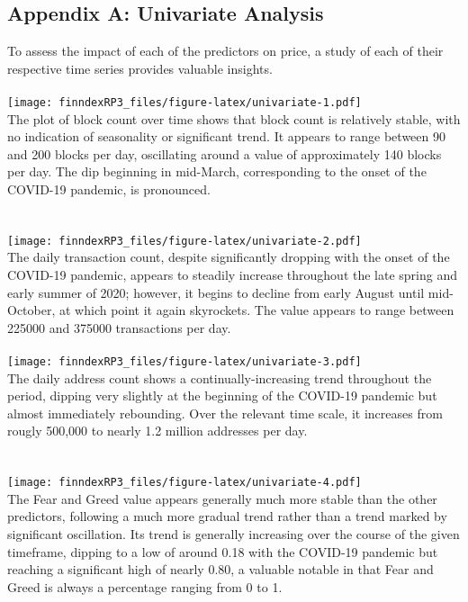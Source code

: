 \documentclass{article}
\begin{document}
\subsection{Appendix A: Univariate Analysis}
To assess the impact of each of the predictors on price, a study of each of their respective time series provides valuable insights. \\~\\
\texttt{[image: finndexRP3\_files/figure-latex/univariate-1.pdf]} \\
The plot of block count over time shows that block count is relatively stable, with no indication of seasonality or significant trend. It appears to range between 90 and 200 blocks per day, oscillating around a value of approximately 140 blocks per day. The dip beginning in mid-March, corresponding to the onset of the COVID-19 pandemic, is pronounced. \\~\\~\\
\texttt{[image: finndexRP3\_files/figure-latex/univariate-2.pdf]} \\
The daily transaction count, despite significantly dropping with the onset of the COVID-19 pandemic, appears to steadily increase throughout the late spring and early summer of 2020; however, it begins to decline from early August until mid-October, at which point it again skyrockets. The value appears to range between 225000 and 375000 transactions per day. \\~\\
\texttt{[image: finndexRP3\_files/figure-latex/univariate-3.pdf]} \\ 
The daily address count shows a continually-increasing trend throughout the period, dipping very slightly at the beginning of the COVID-19 pandemic but almost immediately rebounding. Over the relevant time scale, it increases from rougly 500,000 to nearly 1.2 million addresses per day. \\~\\~\\
\texttt{[image: finndexRP3\_files/figure-latex/univariate-4.pdf]} \\
The Fear and Greed value appears generally much more stable than the other predictors, following a much more gradual trend rather than a trend marked by significant oscillation. Its trend is generally increasing over the course of the given timeframe, dipping to a low of around 0.18 with the COVID-19 pandemic but reaching a significant high of nearly 0.80, a valuable notable in that Fear and Greed is always a percentage ranging from 0 to 1. \\~\\~\\
\end{document}
